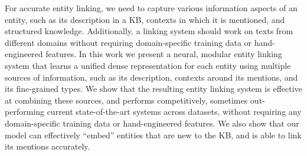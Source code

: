 For accurate entity linking, we need to capture various information aspects of an entity, such as its description in a KB, contexts in which it is mentioned, and structured knowledge. Additionally, a linking system should work on texts from different domains without requiring domain-specific training data or hand-engineered features. In this work we present a neural, modular entity linking system that learns a unified dense representation for each entity using multiple sources of information, such as its description, contexts around its mentions, and its fine-grained types. We show that the resulting entity linking system is effective at combining these sources, and performs competitively, sometimes out-performing current state-of-the-art systems across datasets, without requiring any domain-specific training data or hand-engineered features. We also show that our model can effectively ``embed'' entities that are new to the KB, and is able to link its mentions accurately.
